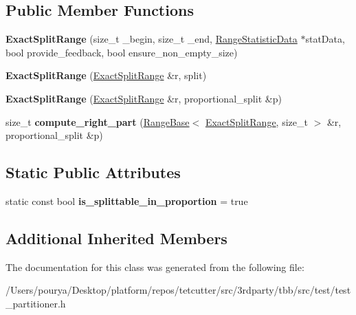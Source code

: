 \subsection*{Public Member Functions}
\begin{DoxyCompactItemize}
\item 
\hypertarget{classtest__partitioner__utils_1_1TestRanges_1_1ExactSplitRange_aae9f11c6421c5d5034ff40d25826d36c}{}{\bfseries Exact\+Split\+Range} (size\+\_\+t \+\_\+begin, size\+\_\+t \+\_\+end, \hyperlink{structtest__partitioner__utils_1_1RangeStatisticData}{Range\+Statistic\+Data} $\ast$stat\+Data, bool provide\+\_\+feedback, bool ensure\+\_\+non\+\_\+empty\+\_\+size)\label{classtest__partitioner__utils_1_1TestRanges_1_1ExactSplitRange_aae9f11c6421c5d5034ff40d25826d36c}

\item 
\hypertarget{classtest__partitioner__utils_1_1TestRanges_1_1ExactSplitRange_a6ba060ae028fed04bbc0551c3c8a060d}{}{\bfseries Exact\+Split\+Range} (\hyperlink{classtest__partitioner__utils_1_1TestRanges_1_1ExactSplitRange}{Exact\+Split\+Range} \&r, split)\label{classtest__partitioner__utils_1_1TestRanges_1_1ExactSplitRange_a6ba060ae028fed04bbc0551c3c8a060d}

\item 
\hypertarget{classtest__partitioner__utils_1_1TestRanges_1_1ExactSplitRange_a5c1a3e1e711bf2604801fee396efc028}{}{\bfseries Exact\+Split\+Range} (\hyperlink{classtest__partitioner__utils_1_1TestRanges_1_1ExactSplitRange}{Exact\+Split\+Range} \&r, proportional\+\_\+split \&p)\label{classtest__partitioner__utils_1_1TestRanges_1_1ExactSplitRange_a5c1a3e1e711bf2604801fee396efc028}

\item 
\hypertarget{classtest__partitioner__utils_1_1TestRanges_1_1ExactSplitRange_a6458df35e80856660ffc48bcbe87e84f}{}size\+\_\+t {\bfseries compute\+\_\+right\+\_\+part} (\hyperlink{classtest__partitioner__utils_1_1RangeBase}{Range\+Base}$<$ \hyperlink{classtest__partitioner__utils_1_1TestRanges_1_1ExactSplitRange}{Exact\+Split\+Range}, size\+\_\+t $>$ \&r, proportional\+\_\+split \&p)\label{classtest__partitioner__utils_1_1TestRanges_1_1ExactSplitRange_a6458df35e80856660ffc48bcbe87e84f}

\end{DoxyCompactItemize}
\subsection*{Static Public Attributes}
\begin{DoxyCompactItemize}
\item 
\hypertarget{classtest__partitioner__utils_1_1TestRanges_1_1ExactSplitRange_a2f10c34734e14a7fa33cc9f172e96c41}{}static const bool {\bfseries is\+\_\+splittable\+\_\+in\+\_\+proportion} = true\label{classtest__partitioner__utils_1_1TestRanges_1_1ExactSplitRange_a2f10c34734e14a7fa33cc9f172e96c41}

\end{DoxyCompactItemize}
\subsection*{Additional Inherited Members}


The documentation for this class was generated from the following file\+:\begin{DoxyCompactItemize}
\item 
/\+Users/pourya/\+Desktop/platform/repos/tetcutter/src/3rdparty/tbb/src/test/test\+\_\+partitioner.\+h\end{DoxyCompactItemize}
